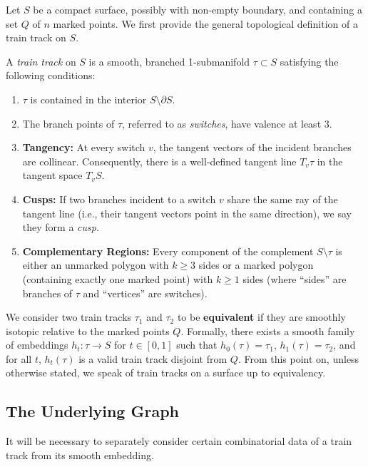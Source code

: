 Let $S$ be a compact surface, possibly with non-empty boundary, and containing a set $Q$ of $n$ marked points. We first provide the general topological definition of a train track on $S$.

\begin{definition}\label{def:train_track_general}
    A \textit{train track} on $S$ is a smooth, branched 1-submanifold $\tau \subset S$ satisfying the following conditions:
    \begin{enumerate}
        \item $\tau$ is contained in the interior $S \setminus \partial S$.
        \item The branch points of $\tau$, referred to as \textit{switches}, have valence at least $3$.
        \item \textbf{Tangency:} At every switch $v$, the tangent vectors of the incident branches are collinear. Consequently, there is a well-defined tangent line $T_v \tau$ in the tangent space $T_v S$.
        \item \textbf{Cusps:} If two branches incident to a switch $v$ share the same ray of the tangent line (i.e., their tangent vectors point in the same direction), we say they form a \textit{cusp}.
        \item \textbf{Complementary Regions:} Every component of the complement $S \setminus \tau$ is either an unmarked polygon with $k \geq 3$ sides or a marked polygon (containing exactly one marked point) with $k \geq 1$ sides (where ``sides'' are branches of $\tau$ and ``vertices'' are switches).
    \end{enumerate}
\end{definition}

We consider two train tracks $\tau_1$ and $\tau_2$ to be \textbf{equivalent} if they are smoothly isotopic relative to the marked points $Q$. Formally, there exists a smooth family of embeddings $h_t: \tau \to S$ for $t \in [0,1]$ such that $h_0(\tau) = \tau_1$, $h_1(\tau) = \tau_2$, and for all $t$, $h_t(\tau)$ is a valid train track disjoint from $Q$. From this point on, unless otherwise stated, we speak of train tracks on a surface up to equivalency.

\subsection{The Underlying Graph}
It will be necessary to separately consider certain combinatorial data of a train track from its smooth embedding.

